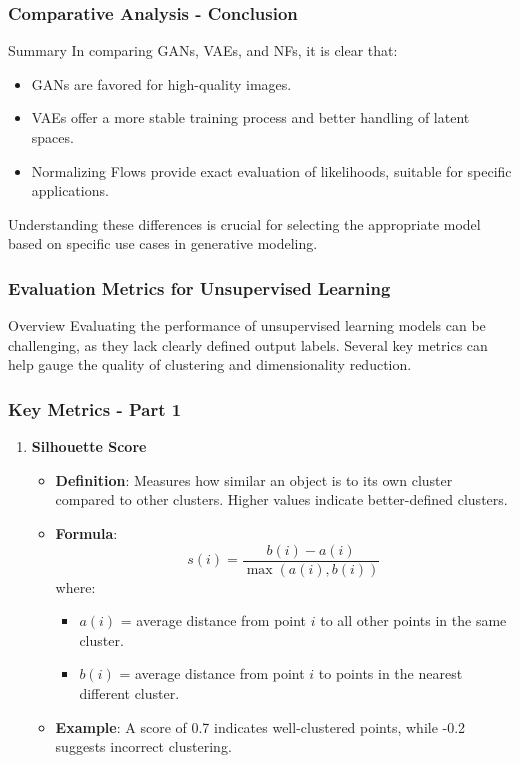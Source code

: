 \documentclass[aspectratio=169]{beamer}
\begin{document}
\begin{frame}[fragile]
    \frametitle{Comparative Analysis - Conclusion}
    \begin{block}{Summary}
        In comparing GANs, VAEs, and NFs, it is clear that:
        \begin{itemize}
            \item GANs are favored for high-quality images.
            \item VAEs offer a more stable training process and better handling of latent spaces.
            \item Normalizing Flows provide exact evaluation of likelihoods, suitable for specific applications.
        \end{itemize}
        Understanding these differences is crucial for selecting the appropriate model based on specific use cases in generative modeling.
    \end{block}
\end{frame}

\begin{frame}[fragile]
    \frametitle{Evaluation Metrics for Unsupervised Learning}
    \begin{block}{Overview}
        Evaluating the performance of unsupervised learning models can be challenging, as they lack clearly defined output labels. Several key metrics can help gauge the quality of clustering and dimensionality reduction.
    \end{block}
\end{frame}

\begin{frame}[fragile]
    \frametitle{Key Metrics - Part 1}
    \begin{enumerate}
        \item \textbf{Silhouette Score}
            \begin{itemize}
                \item \textbf{Definition}: Measures how similar an object is to its own cluster compared to other clusters. Higher values indicate better-defined clusters.
                \item \textbf{Formula}:
                \begin{equation}
                    s(i) = \frac{b(i) - a(i)}{\max(a(i), b(i))}
                \end{equation}
                where:
                \begin{itemize}
                    \item \( a(i) \) = average distance from point \( i \) to all other points in the same cluster.
                    \item \( b(i) \) = average distance from point \( i \) to points in the nearest different cluster.
                \end{itemize}
                \item \textbf{Example}: A score of 0.7 indicates well-clustered points, while -0.2 suggests incorrect clustering.
            \end{itemize}
    \end{enumerate}
\end{frame}
\end{document}
